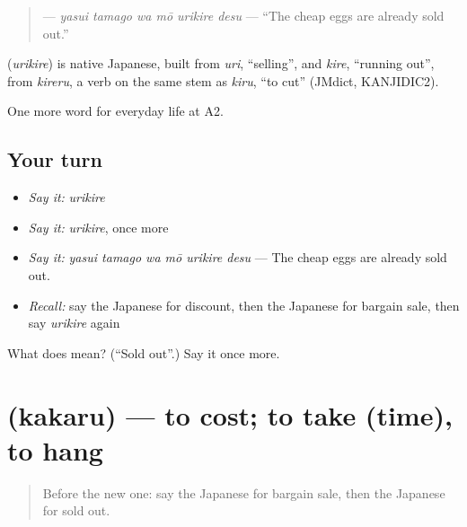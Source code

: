 \begin{quote}
\textbf{   } — \emph{yasui tamago wa mō urikire desu} — \textquotedblleft{}The cheap eggs are already sold out.\textquotedblright{}
\end{quote}

\begin{cousinweb}
\textbf{} (\emph{urikire}) is native Japanese, built from \emph{uri}, \textquotedblleft{}selling\textquotedblright{}, and \emph{kire}, \textquotedblleft{}running out\textquotedblright{}, from \emph{kireru}, a verb on the same stem as \emph{kiru}, \textquotedblleft{}to cut\textquotedblright{} (JMdict, KANJIDIC2).
\end{cousinweb}

\begin{grammarlens}[title={What you've built}]
One more word for everyday life at A2.
\end{grammarlens}

\subsection*{Your turn}
\begin{itemize}
\raggedright
  \item \emph{Say it:} \emph{urikire}
  \item \emph{Say it:} \emph{urikire}, once more
  \item \emph{Say it:} \emph{yasui tamago wa mō urikire desu} — The cheap eggs are already sold out.
  \item \emph{Recall:} say the Japanese for discount, then the Japanese for bargain sale, then say \emph{urikire} again
\end{itemize}

\begin{tcolorbox}[breakable,colback=teal!4,colframe=teal!35!black,title={Before you move on}]
What does  mean? (\textquotedblleft{}Sold out\textquotedblright{}.) Say it once more.
\end{tcolorbox}
\section[\texorpdfstring{\ja{かかる} (kakaru)}{かかる (kakaru)}]{ (kakaru) — to cost; to take (time), to hang}

\label{lesson:JA-C185-kakaru}



\begin{quote}
Before the new one: say the Japanese for bargain sale, then the Japanese for sold out.
\end{quote}


